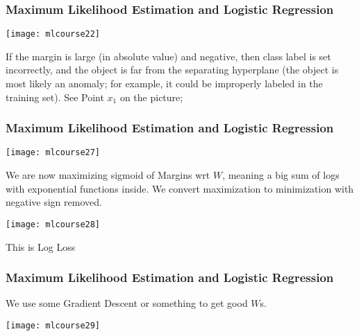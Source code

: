 \begin{frame}[fragile]\frametitle{Maximum Likelihood Estimation and Logistic Regression}

\begin{center}
\texttt{[image: mlcourse22]}
\end{center}

If the margin is large (in absolute value) and negative, then class label is set incorrectly, and the object is far from the separating hyperplane (the object is most likely an anomaly; for example, it could be improperly labeled in the training set). See Point $x_1$ on the picture;


\end{frame}
\begin{frame}[fragile]\frametitle{Maximum Likelihood Estimation and Logistic Regression}

\begin{center}
\texttt{[image: mlcourse27]}
\end{center}

We are now maximizing sigmoid of Margins wrt $W$, meaning a big sum of logs with exponential functions inside. We convert maximization to minimization with negative sign removed.

\begin{center}
\texttt{[image: mlcourse28]}
\end{center}
This is Log Loss
\end{frame}

\begin{frame}[fragile]\frametitle{Maximum Likelihood Estimation and Logistic Regression}
We use some Gradient Descent or something to get good $W$s.

\begin{center}
\texttt{[image: mlcourse29]}
\end{center}

\end{frame}

